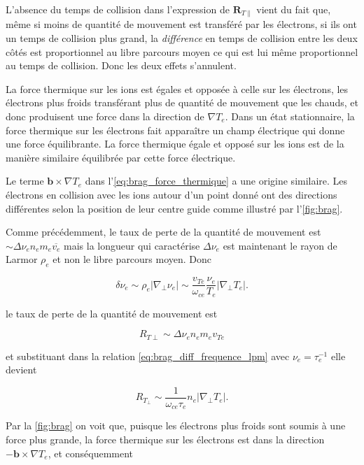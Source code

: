 \documentclass[main.tex]{subfiles}
\begin{document}
L'absence du temps de collision dans l'expression de \( \bm{R}_{T\parallel }\) vient du fait que, même si moins de quantité de mouvement est transféré par les électrons, si ils ont un temps de collision plus grand, la \textit{différence} en temps de collision entre les deux côtés est proportionnel au libre parcours moyen ce qui est lui même proportionnel au temps de collision. Donc les deux effets s'annulent.

La force thermique sur les ions est égales et opposée à celle sur les électrons, les électrons plus froids transférant plus de quantité de mouvement que les chauds, et donc produisent une force dans la direction de \( \nabla T_e \). Dans un état stationnaire, la force thermique sur les électrons fait apparaître un champ électrique qui donne une force équilibrante.
La force thermique égale et opposé sur les ions est de la manière similaire équilibrée par cette force électrique.

Le terme \( \bm{b} \times \nabla T_e \) dans l'\autoref{eq:brag_force_thermique} a une origine similaire.
Les électrons en collision avec les ions autour d'un point donné ont des directions différentes selon la position de leur centre guide comme illustré par l'\autoref{fig:brag}.

Comme précédemment, le taux de perte de la quantité de mouvement est \( \sim \Delta \nu_e n_e m_e \overline{v_e} \) mais la longueur qui caractérise \( \Delta \nu_e \) est maintenant le rayon de Larmor \( \rho_e \) et non le libre parcours moyen. Donc

\begin{equation}
	\delta \nu_e \sim \rho_e \left\vert \nabla_\perp \nu_e\right\vert \sim \frac{v_{Te}}{\omega_{ce}} \frac{\nu_e}{T_e} \left\vert \nabla_\perp T_e \right\vert.
	\label{eq:brag_diff_frequence_lpm}
\end{equation}

\nit le taux de perte de la quantité de mouvement est

\[
	R_{T\perp} \sim \Delta \nu_e n_e m_e v_{Te}
\]

\nit et substituant dans la relation \ref{eq:brag_diff_frequence_lpm} avec \( \nu_e = \tau_e^{-1} \) elle devient

\[
	R_{T_\perp} \sim \frac{1}{\omega_{ce}\tau_e} n_e \left\vert \nabla_\perp T_e \right\vert.
\]

\nit Par la \autoref{fig:brag} on voit que, puisque les électrons plus froids sont soumis à une force plus grande, la force thermique sur les électrons est dans la direction \( - \bm{b} \times \nabla T_e \), et conséquemment
\end{document}
